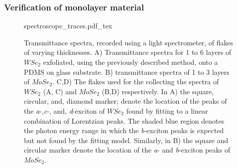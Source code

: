 \subsubsection{Verification of monolayer material}
\begin{figure}[h]
	\centering
	\def\svgwidth{1\linewidth}
	{spectroscope_traces.pdf_tex}
	\caption{Transmittance spectra, recorded using a light spectrometer, of flakes of varying thicknesses. A) Transmittance spectra for 1 to 6 layers of $WSe_2$ exfoliated, using the previously described method, onto a PDMS on glass substrate. B) transmittance spectra of 1 to 3 layers of $MoSe_2$. C,D) The flakes used for the collecting the spectra of $WSe_2$ (A, C) and $MoSe_2$ (B,D) respectively.
    In A) the square, circular, and, diamond marker; denote the location of the peaks of the \textit{a}-,\textit{c}-, and, \textit{d}-exciton of $WSe_2$ found by fitting to a linear combination of Lorentzian peaks. The shaded blue region denotes the photon energy range in which the \textit{b}-exciton peaks is expected but not found by the fitting model.
Similarly, in B) the square and circular marker denote the location of the \textit{a}- and \textit{b}-exciton peaks of $MoSe_2$.}
	\label{fig:spectroscope_traces}
\end{figure}

